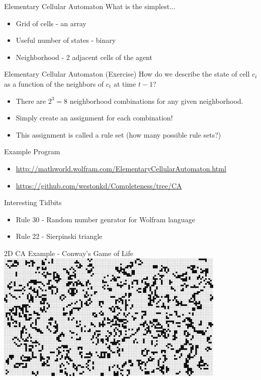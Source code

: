 \documentclass[bigger]{beamer}
\begin{document}
\begin{frame}[label=sec-10]{Elementary Cellular Automaton}
What is the simplest...
\begin{itemize}
\item<1->Grid of cells - an array
\item<1->Useful number of states - binary
\item<1->Neighborhood - 2 adjacent cells of the agent
\end{itemize}
\end{frame}

\begin{frame}[label=sec-11]{Elementary Cellular Automaton (Exercise)}
How do we describe the state of cell \(c_t\) as a function of the neighbors of \(c_t\) at time \(t-1\)?
\begin{itemize}
\item<2->There are \(2^3 = 8\) neighborhood combinations for any given neighborhood.
\item<3->Simply create an assignment for each combination!
\item<4->This assignment is called a rule set (how many possible rule sets?)
\end{itemize}
\end{frame}
\begin{frame}[label=sec-12]{Example Program}
\begin{itemize}
\item \url{http://mathworld.wolfram.com/ElementaryCellularAutomaton.html}
\item \url{https://github.com/westonkd/Completeness/tree/CA}
\end{itemize}
\end{frame}

\begin{frame}[label=sec-13]{Interesting Tidbits}
\begin{itemize}
\item<1->Rule 30 - Random number genrator for Wolfram language
\item<2->Rule 22 - Sierpinski triangle
\end{itemize}
\end{frame}
\begin{frame}[label=sec-14]{2D CA Example - Conway's Game of Life}
\includegraphics[width=11cm]{images/gol1.jpg}
\end{frame}
\end{document}
